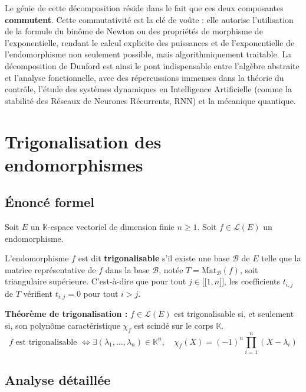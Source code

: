 \documentclass[11pt,a4paper]{article}
\begin{document}
Le génie de cette décomposition réside dans le fait que ces deux composantes \textbf{commutent}. Cette commutativité est la clé de voûte : elle autorise l'utilisation de la formule du binôme de Newton ou des propriétés de morphisme de l'exponentielle, rendant le calcul explicite des puissances et de l'exponentielle de l'endomorphisme non seulement possible, mais algorithmiquement traitable. La décomposition de Dunford est ainsi le pont indispensable entre l'algèbre abstraite et l'analyse fonctionnelle, avec des répercussions immenses dans la théorie du contrôle, l'étude des systèmes dynamiques en Intelligence Artificielle (comme la stabilité des Réseaux de Neurones Récurrents, RNN) et la mécanique quantique.

\section{Trigonalisation des endomorphismes}

\subsection{Énoncé formel}

Soit $E$ un $\mathbb{K}$-espace vectoriel de dimension finie $n \geq 1$.
Soit $f \in \mathcal{L}(E)$ un endomorphisme.

L'endomorphisme $f$ est dit \textbf{trigonalisable} s'il existe une base $\mathcal{B}$ de $E$ telle que la matrice représentative de $f$ dans la base $\mathcal{B}$, notée $T = \text{Mat}_{\mathcal{B}}(f)$, soit triangulaire supérieure. C'est-à-dire que pour tout $j \in \mathopen{[\![} 1, n \mathclose{]\!]}$, les coefficients $t_{i,j}$ de $T$ vérifient $t_{i,j} = 0$ pour tout $i > j$.

\textbf{Théorème de trigonalisation :}
$f \in \mathcal{L}(E)$ est trigonalisable si, et seulement si, son polynôme caractéristique $\chi_f$ est scindé sur le corps $\mathbb{K}$.
$$ f \text{ est trigonalisable } \iff \exists (\lambda_1, \ldots, \lambda_n) \in \mathbb{K}^n, \quad \chi_f(X) = (-1)^n \prod_{i=1}^n (X - \lambda_i) $$

\subsection{Analyse détaillée}
\end{document}
